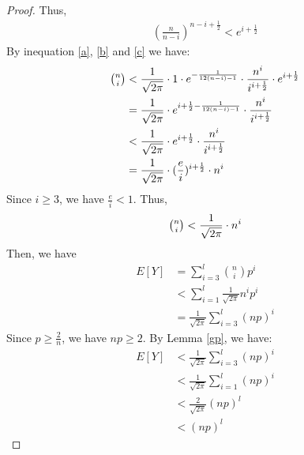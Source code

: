 \begin{proof}
Thus, 
\begin{align}
    (\frac{n}{n-i})^{n-i+\frac{1}{2}} <e^{i+\frac{1}{2}}\label{c}
\end{align}
By inequation \ref{a}, \ref{b} and \ref{c} we have:
\begin{align}
\nonumber \tbinom{n}{i} &<\frac{1}{\sqrt{2\pi}}\cdot 1\cdot e^{-\frac{1}{12(n-i)-1}} \cdot \frac{n^i}{i^{i+\frac{1}{2}}} \cdot e^{i+\frac{1}{2}}\\
\nonumber &= \frac{1}{\sqrt{2\pi}}\cdot e^{i+\frac{1}{2}-\frac{1}{12(n-i)-1}} \cdot \frac{n^i}{i^{i+\frac{1}{2}}}\\
\nonumber &< \frac{1}{\sqrt{2\pi}}\cdot e^{i+\frac{1}{2}} \cdot \frac{n^i}{i^{i+\frac{1}{2}}}\\
\nonumber &= \frac{1}{\sqrt{2\pi}}\cdot (\frac{e}{i})^{i+\frac{1}{2}}\cdot n^i
\end{align}
Since $i\ge 3$, we have $\frac{e}{i}< 1$. Thus,
\begin{align}
    \nonumber \tbinom{n}{i} < \frac{1}{\sqrt{2\pi}}\cdot n^i
\end{align}
Then, we have
\begin{align}
    \nonumber E[Y] &= \sum_{i = 3}^{l}{\binom{n}{i} p^i} 
    \\
    \nonumber &<\sum_{i=1}^{l}\frac{1}{\sqrt{2\pi}}n^ip^i\\
    \nonumber &= \frac{1}{\sqrt{2\pi}}\sum_{i=3}^{l}(np)^i
\end{align}
Since $p \ge \frac{2}{n}$, we have $np\ge 2$.
By Lemma \ref{gp}, we have:
\begin{align}
    \nonumber E[Y]& <   \frac{1}{\sqrt{2\pi}}\sum_{i=3}^{l}(np)^i \\
    \nonumber & < \frac{1}{\sqrt{2\pi}}\sum_{i=1}^{l}(np)^i \\
    \nonumber & < \frac{2}{\sqrt{2\pi}}(np)^l\\
    \nonumber & <(np)^l
\end{align}


\end{proof}